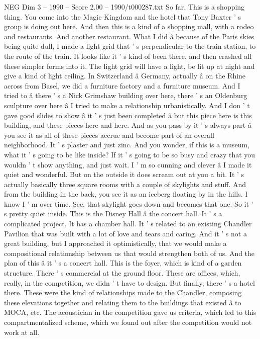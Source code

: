 \begin{textsample}{NEG Dim 3 – 1990 – Score 2.00 – 1990/t000287.txt}
So far.
This is a shopping thing.
You come into the Magic Kingdom and the hotel that Tony Baxter ' s group is doing out here.
And then this is a kind of a shopping mall, with a rodeo and restaurants.
And another restaurant.
What I did â because of the Paris skies being quite dull, I made a light grid that ' s perpendicular to the train station, to the route of the train.
It looks like it ' s kind of been there, and then crashed all these simpler forms into it.
The light grid will have a light, be lit up at night and give a kind of light ceiling.
In Switzerland â Germany, actually â on the Rhine across from Basel, we did a furniture factory and a furniture museum.
And I tried to â there ' s a Nick Grimshaw building over here, there ' s an Oldenburg sculpture over here â I tried to make a relationship urbanistically.
And I don ' t gave good slides to show â it ' s just been completed â but this piece here is this building, and these pieces here and here.
And as you pass by it ' s always part â you see it as all of these pieces accrue and become part of an overall neighborhood.
It ' s plaster and just zinc.
And you wonder, if this is a museum, what it ' s going to be like inside?
If it ' s going to be so busy and crazy that you wouldn ' t show anything, and just wait.
I ' m so cunning and clever â I made it quiet and wonderful.
But on the outside it does scream out at you a bit.
It ' s actually basically three square rooms with a couple of skylights and stuff.
And from the building in the back, you see it as an iceberg floating by in the hills.
I know I ' m over time.
See, that skylight goes down and becomes that one.
So it ' s pretty quiet inside.
This is the Disney Hall â the concert hall.
It ' s a complicated project.
It has a chamber hall.
It ' s related to an existing Chandler Pavilion that was built with a lot of love and tears and caring.
And it ' s not a great building, but I approached it optimistically, that we would make a compositional relationship between us that would strengthen both of us.
And the plan of this â it ' s a concert hall.
This is the foyer, which is kind of a garden structure.
There ' s commercial at the ground floor.
These are offices, which, really, in the competition, we didn ' t have to design.
But finally, there ' s a hotel there.
These were the kind of relationships made to the Chandler, composing these elevations together and relating them to the buildings that existed â to MOCA, etc.
The acoustician in the competition gave us criteria, which led to this compartmentalized scheme, which we found out after the competition would not work at all.

\end{textsample}
